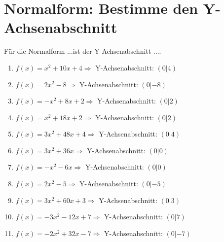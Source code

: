 \documentclass{article}%
\begin{document}
\section{Normalform: Bestimme den Y{-}Achsenabschnitt}%
\label{sec:NormalformBestimmedenY{-}Achsenabschnitt}%
Für die Normalform ...ist der Y{-}Achsenabschnitt ....%
\begin{enumerate}[label=\alph*)]%
\item%
\newline\vspace{0.5cm}$f(x)=x^2 + 10x + 4 \Rightarrow $ Y-Achsenabschnitt: $ (0|4) $%
\item%
\newline\vspace{0.5cm}$f(x)=2x^2 - 8 \Rightarrow $ Y-Achsenabschnitt: $ (0|-8) $%
\item%
\newline\vspace{0.5cm}$f(x)=-x^2 + 8x + 2 \Rightarrow $ Y-Achsenabschnitt: $ (0|2) $%
\item%
\newline\vspace{0.5cm}$f(x)=x^2 + 18x + 2 \Rightarrow $ Y-Achsenabschnitt: $ (0|2) $%
\item%
\newline\vspace{0.5cm}$f(x)=3x^2 + 48x + 4 \Rightarrow $ Y-Achsenabschnitt: $ (0|4) $%
\item%
\newline\vspace{0.5cm}$f(x)=3x^2 + 36x \Rightarrow $ Y-Achsenabschnitt: $ (0|0) $%
\item%
\newline\vspace{0.5cm}$f(x)=-x^2 - 6x \Rightarrow $ Y-Achsenabschnitt: $ (0|0) $%
\item%
\newline\vspace{0.5cm}$f(x)=2x^2 - 5 \Rightarrow $ Y-Achsenabschnitt: $ (0|-5) $%
\item%
\newline\vspace{0.5cm}$f(x)=3x^2 + 60x + 3 \Rightarrow $ Y-Achsenabschnitt: $ (0|3) $%
\item%
\newline\vspace{0.5cm}$f(x)=-3x^2 - 12x + 7 \Rightarrow $ Y-Achsenabschnitt: $ (0|7) $%
\item%
\newline\vspace{0.5cm}$f(x)=-2x^2 + 32x - 7 \Rightarrow $ Y-Achsenabschnitt: $ (0|-7) $%

\end{enumerate}
\end{document}
